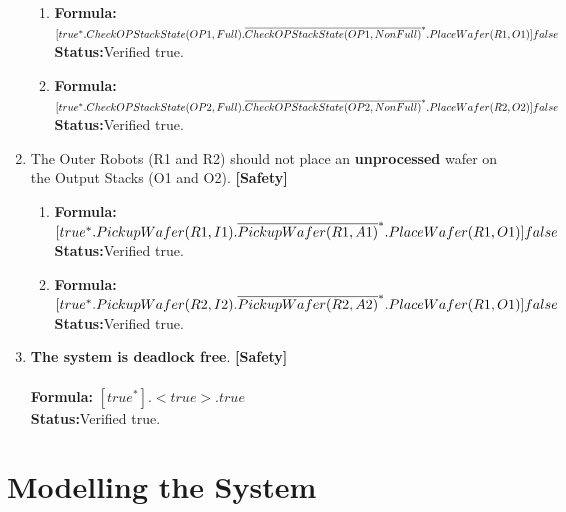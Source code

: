 \documentclass[a4paper,12pt]{article}
\begin{document}
\begin{enumerate}
\begin{enumerate}
			\item \textbf{Formula:} $[true^* . CheckOPStackState(OP1,Full). \\\overline{CheckOPStackState(OP1, NonFull)}^* .PlaceWafer(R1, O1)] false $
			\\\textbf{Status:}Verified true.
			
			\item \textbf{Formula:} $[true^* . CheckOPStackState(OP2,Full). \\\overline{CheckOPStackState(OP2, NonFull)}^* .PlaceWafer(R2, O2)] false $
			\\\textbf{Status:}Verified true.
		\end{enumerate}
		\item The Outer Robots (R1 and R2) should not place an \textbf{unprocessed} wafer on the Output Stacks (O1 and O2). \textbf{[Safety]}
		\begin{enumerate}
			
			\item \textbf{Formula:} $[true^* . PickupWafer(R1, I1) .\overline{PickupWafer(R1, A1)}^* . 
			\\PlaceWafer(R1, O1)] false $
			\\\textbf{Status:}Verified true.
			
			\item \textbf{Formula:} $[true^* . PickupWafer(R2, I2) .\overline{PickupWafer(R2, A2)}^* . 
			\\PlaceWafer(R1, O1)] false $
			\\\textbf{Status:}Verified true.
			
		\end{enumerate}
		\item \textbf{The system is deadlock free}. \textbf{[Safety]}
		\\
		\\\textbf{Formula:} $[true^*]. <true> . true$
		\\\textbf{Status:}Verified true.
	\end{enumerate}
	
	\newpage
	\section{Modelling the System}
\end{document}

